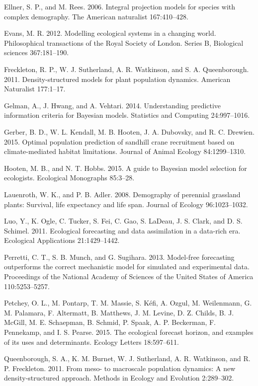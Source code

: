 \documentclass[12pt,]{article}
\begin{document}
Ellner, S. P., and M. Rees. 2006. Integral projection models for species
with complex demography. The American naturalist 167:410--428.

Evans, M. R. 2012. Modelling ecological systems in a changing world.
Philosophical transactions of the Royal Society of London. Series B,
Biological sciences 367:181--190.

Freckleton, R. P., W. J. Sutherland, A. R. Watkinson, and S. A.
Queenborough. 2011. Density-structured models for plant population
dynamics. American Naturalist 177:1--17.

Gelman, A., J. Hwang, and A. Vehtari. 2014. Understanding predictive
information criteria for Bayesian models. Statistics and Computing
24:997--1016.

Gerber, B. D., W. L. Kendall, M. B. Hooten, J. A. Dubovsky, and R. C.
Drewien. 2015. Optimal population prediction of sandhill crane
recruitment based on climate-mediated habitat limitations. Journal of
Animal Ecology 84:1299--1310.

Hooten, M. B., and N. T. Hobbs. 2015. A guide to Bayesian model
selection for ecologists. Ecological Monographs 85:3--28.

Lauenroth, W. K., and P. B. Adler. 2008. Demography of perennial
grassland plants: Survival, life expectancy and life span. Journal of
Ecology 96:1023--1032.

Luo, Y., K. Ogle, C. Tucker, S. Fei, C. Gao, S. LaDeau, J. S. Clark, and
D. S. Schimel. 2011. Ecological forecasting and data assimilation in a
data-rich era. Ecological Applications 21:1429--1442.

Perretti, C. T., S. B. Munch, and G. Sugihara. 2013. Model-free
forecasting outperforms the correct mechanistic model for simulated and
experimental data. Proceedings of the National Academy of Sciences of
the United States of America 110:5253--5257.

Petchey, O. L., M. Pontarp, T. M. Massie, S. K{é}fi, A. Ozgul, M.
Weilenmann, G. M. Palamara, F. Altermatt, B. Matthews, J. M. Levine, D.
Z. Childs, B. J. McGill, M. E. Schaepman, B. Schmid, P. Spaak, A. P.
Beckerman, F. Pennekamp, and I. S. Pearse. 2015. The ecological forecast
horizon, and examples of its uses and determinants. Ecology Letters
18:597--611.

Queenborough, S. A., K. M. Burnet, W. J. Sutherland, A. R. Watkinson,
and R. P. Freckleton. 2011. From meso- to macroscale population
dynamics: A new density-structured approach. Methods in Ecology and
Evolution 2:289--302.
\end{document}
